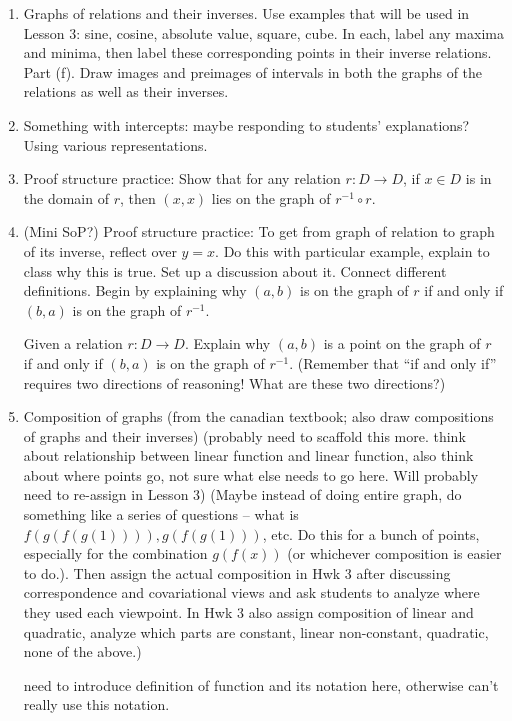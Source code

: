 \documentclass[11pt]{article}
\theoremstyle{definition}
\begin{document}
\begin{enumerate}
\item \label{h: key graphs} Graphs of relations and their inverses. Use examples that will be used in Lesson 3: sine, cosine, absolute value, square, cube.  In each, label any maxima and minima, then label these corresponding points in their inverse relations. Part (f). Draw images and preimages of intervals in both the graphs of the relations as well as their inverses.
\item Something with intercepts: maybe responding to students' explanations? Using various representations.
\item Proof structure practice: Show that for any relation $r:D\to D$, if $x\in D$ is in the domain of $r$, then $(x,x)$ lies on the graph of $r^{-1}\circ r$. 
\item (Mini SoP?) Proof structure practice: To get from graph of relation to graph of its inverse, reflect over $y=x$. Do this with particular example, explain to class why this is true. Set up a discussion about it. Connect different definitions. Begin by explaining why $(a,b)$ is on the graph of $r$ if and only if $(b,a)$ is on the graph of $r^{-1}$.

Given a relation $r:D\to D$. Explain why $(a,b)$ is a point on the graph of $r$ if and only if $(b,a)$ is on the graph of $r^{-1}$. (Remember that ``if and only if'' requires two directions of reasoning! What are these two directions?)

\item \label{h: composition correspondence} 
Composition of graphs (from the canadian textbook; also draw compositions of graphs and their inverses) (probably need to scaffold this more. think about relationship between linear function and linear function, also think about where points go, not sure what else needs to go here. Will probably need to re-assign in Lesson 3) (Maybe instead of doing entire graph, do something like a series of questions -- what is $f(g(f(g(1)))), g(f(g(1)))$, etc. Do this for a bunch of points, especially for the combination $g(f(x))$ (or whichever composition is easier to do.). Then assign the actual composition in Hwk 3 after discussing correspondence and covariational views and ask students to analyze where they used each viewpoint. In Hwk 3 also assign composition of linear and quadratic, analyze which parts are constant, linear non-constant, quadratic, none of the above.)

need to introduce definition of function and its notation here, otherwise can't really use this notation.


\end{enumerate}
\end{document}
